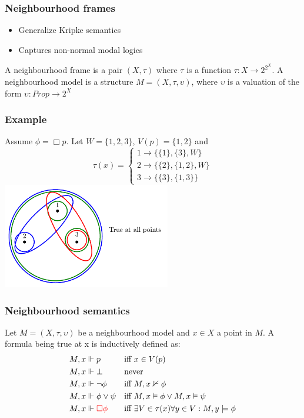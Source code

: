 \documentclass[hyperref={pdfpagelabels=false},t,10pt]{beamer}
\begin{document}
\begin{frame}
  \frametitle{Neighbourhood frames}
    \begin{itemize}
      \item Generalize Kripke semantics
      \item Captures non-normal modal logics
    \end{itemize}

    \pause
    \begin{definition}
      A neighbourhood frame is a pair $(X, \tau)$ where $\tau$ is a function $\tau : X \rightarrow 2^{2^X}$. \newline
      A neighbourhood model is a structure $M = (X, \tau, \upsilon)$, where $\upsilon$ is a valuation of the form $\upsilon : Prop \rightarrow 2^X$
    \end{definition}
\end{frame}

\begin{frame}
  \frametitle{Example}
      Assume $\phi = \Box p$. Let $W = \{1,2,3\}$, $V(p) = \{1,2\}$ and 
    \[
            \tau(x) = 
            \begin{cases}
                1 \rightarrow \{\{1\}, \{3\}, W\} \\
                2 \rightarrow \{\{2\}, \{1,2\}, W\} \\
                3 \rightarrow \{\{3\}, \{1,3\}\}
            \end{cases}
    \] 
    \centering
      \includegraphics[width=0.55\textwidth]{Example3.pdf}
\end{frame}

\begin{frame}
  \frametitle{Neighbourhood semantics}
  \begin{definition}
  Let $M = (X,\tau,\upsilon)$ be a neighbourhood model and $x \in X$ a point in $M$. A formula being true at x is inductively defined as:
      \begin{align*}
        M,x &\Vdash p &&\text{iff } x \in V(p)\\
        M,x &\Vdash \bot &&\text{never } \\
        M,x &\Vdash \neg \phi &&\text{iff } M,x \nVdash \phi\\
        M,x &\Vdash \phi \lor \psi &&\text{iff } M,x \vDash \phi \lor M,x \vDash \psi\\
        M,x &\Vdash \textcolor{red}{\Box \phi} &&\text{iff } \exists V \in \tau(x) \forall y \in V : M,y \models \phi
    \end{align*}
  \end{definition}
\end{frame}
\end{document}
